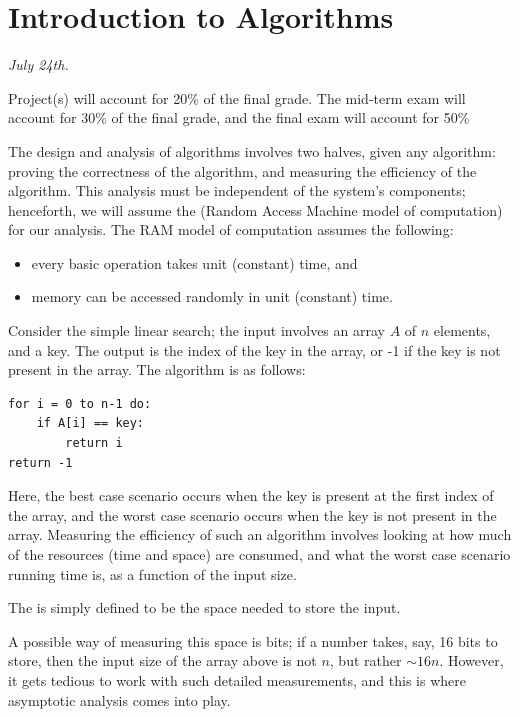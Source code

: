 \chapter{Introduction to Algorithms}

\textit{July 24th.}

Project(s) will account for 20\% of the final grade. The mid-term exam will account for 30\% of the final grade, and the final exam will account for 50\%

The design and analysis of algorithms involves two halves, given any algorithm: proving the correctness of the algorithm, and measuring the efficiency of the algorithm. This analysis must be independent of the system's components; henceforth, we will assume the  (Random Access Machine model of computation) for our analysis. The RAM model of computation assumes the following:
\begin{itemize}
    \item every basic operation takes unit (constant) time, and
    \item memory can be accessed randomly in unit (constant) time.
\end{itemize}

Consider the simple linear search; the input involves an array $A$ of $n$ elements, and a key. The output is the index of the key in the array, or -1 if the key is not present in the array. The algorithm is as follows:
\begin{verbatim}
for i = 0 to n-1 do:
    if A[i] == key:
        return i
return -1
\end{verbatim}
Here, the best case scenario occurs when the key is present at the first index of the array, and the worst case scenario occurs when the key is not present in the array. Measuring the efficiency of such an algorithm involves looking at how much of the resources (time and space) are consumed, and what the worst case scenario running time is, as a function of the input size.

\begin{definition}
    The  is simply defined to be the space needed to store the input.
\end{definition}
A possible way of measuring this space is bits; if a number takes, say, 16 bits to store, then the input size of the array above is not $n$, but rather $\sim 16n$. However, it gets tedious to work with such detailed measurements, and this is where asymptotic analysis comes into play.

